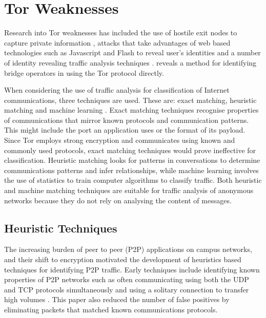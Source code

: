 \documentclass{ecuthesis}
\begin{document}
\section{Tor Weaknesses}

Research into Tor weaknesses has included the use of hostile exit nodes to
capture private information \parencite{website:tor-password-leak}, attacks that
take advantages of web based technologies such as Javascript and Flash to reveal
user's identities \parencite{Abbott:2007p298} and a number of identity revealing
traffic analysis techniques
\parencite{Murdoch:2005p325,Abbott:2007p298,Evans:2009p315}.
\citeauthor{McLachlan:2009p197} reveals a method for identifying bridge
operators in \textcite{McLachlan:2009p197} using the Tor protocol directly. 

When considering the use of traffic analysis for classification of Internet
communications, three techniques are used. These are: exact matching, heuristic
matching and machine learning \parencite{Zhang:2009p1188}. Exact matching
techniques recognise properties of communications that mirror known protocols
and communication patterns. This might include the port an application uses or
the format of its payload. Since Tor employs strong encryption and communicates
using known and commonly used protocols, exact matching techniques would prove
ineffective for classification. Heuristic matching looks for patterns in
conversations to determine communications patterns and infer relationships,
while machine learning involves the use of statistics to train computer
algorithms to classify traffic. Both heuristic and machine matching techniques
are suitable for traffic analysis of anonymous networks because they do not
rely on analysing the content of messages.

\subsection{Heuristic Techniques}

The increasing burden of peer to peer (P2P) applications on campus networks,
and their shift to encryption motivated the development of heuristics based
techniques for identifying P2P traffic. Early techniques include identifying
known properties of P2P networks such as often communicating using both the UDP
and TCP protocols simultaneously and using a solitary connection to transfer
high volumes \parencite{Karagiannis:2004p6400}. This paper also reduced the
number of false positives by eliminating packets that matched known
communications protocols.
\end{document}
